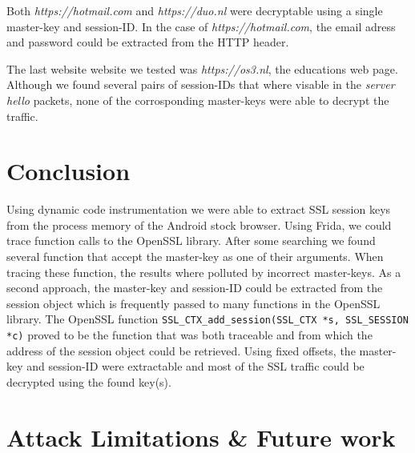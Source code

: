 \documentclass[12pt, a4paper]{report}
\begin{document}
Both \textit{https://hotmail.com} and \textit{https://duo.nl} were decryptable using a single master-key and session-ID. In the case of \textit{https://hotmail.com}, the email adress and password could be extracted from the HTTP header. 

The last website website we tested was \textit{https://os3.nl}, the educations web page. Although we found several pairs of session-IDs that where visable in the \textit{server hello} packets, none of the corrosponding master-keys were able to decrypt the traffic. 







\chapter{Conclusion}

Using dynamic code instrumentation we were able to extract SSL session keys from the process memory of the Android stock browser. Using Frida, we could trace function calls to the OpenSSL library. After some searching we found several function that accept the master-key as one of their arguments. When tracing these function, the results where polluted by incorrect master-keys. As a second approach, the master-key and session-ID could be extracted from the session object which is frequently passed to many functions in the OpenSSL library. 
\newline
\newline
The OpenSSL function \texttt{SSL\_CTX\_add\_session(SSL\_CTX *s, SSL\_SESSION *c)} proved to be the function that was both traceable and from which the address of the session object could be retrieved. Using fixed offsets, the master-key and session-ID were extractable and most of the SSL traffic could be decrypted using the found key(s).

\chapter{Attack Limitations \& Future work}
\end{document}
